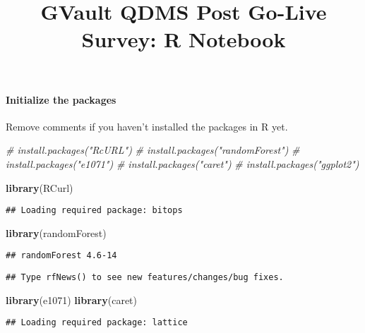 \documentclass[
]{article}
\title{GVault QDMS Post Go-Live Survey: R Notebook}
\author{}
\date{\vspace{-2.5em}}
\newenvironment{Shaded}{\begin{snugshade}}{\end{snugshade}}
\newcommand{\CommentTok}[1]{\textcolor[rgb]{0.56,0.35,0.01}{\textit{#1}}}
\newcommand{\KeywordTok}[1]{\textcolor[rgb]{0.13,0.29,0.53}{\textbf{#1}}}
\newcommand{\NormalTok}[1]{#1}
\begin{document}
\maketitle

\hypertarget{initialize-the-packages}{%
\paragraph{Initialize the packages}\label{initialize-the-packages}}

Remove comments if you haven't installed the packages in R yet.

\begin{Shaded}
\begin{Highlighting}[]
\CommentTok{# install.packages("RcURL")}
\CommentTok{# install.packages("randomForest") }
\CommentTok{# install.packages("e1071")}
\CommentTok{# install.packages("caret")}
\CommentTok{# install.packages("ggplot2")}

\KeywordTok{library}\NormalTok{(RCurl)}
\end{Highlighting}
\end{Shaded}

\begin{verbatim}
## Loading required package: bitops
\end{verbatim}

\begin{Shaded}
\begin{Highlighting}[]
\KeywordTok{library}\NormalTok{(randomForest)  }
\end{Highlighting}
\end{Shaded}

\begin{verbatim}
## randomForest 4.6-14
\end{verbatim}

\begin{verbatim}
## Type rfNews() to see new features/changes/bug fixes.
\end{verbatim}

\begin{Shaded}
\begin{Highlighting}[]
\KeywordTok{library}\NormalTok{(e1071)  }
\KeywordTok{library}\NormalTok{(caret)  }
\end{Highlighting}
\end{Shaded}

\begin{verbatim}
## Loading required package: lattice
\end{verbatim}
\end{document}
